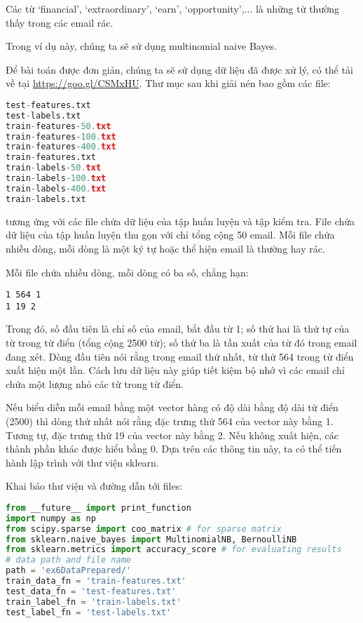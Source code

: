 Các từ `financial',
`extraordinary', `earn', `opportunity',... là những từ thường thấy trong các email rác.
 
Trong ví dụ này, chúng ta sẽ sử dụng multinomial naive Bayes. 
 
Để bài toán được đơn giản, chúng ta sẽ sử dụng dữ liệu đã được xử lý, có thể tải về tại \url{https://goo.gl/CSMxHU}. Thư mục sau khi giải nén bao gồm các file:
\begin{lstlisting}[language=Python]
test-features.txt 
test-labels.txt 
train-features-50.txt 
train-features-100.txt 
train-features-400.txt 
train-features.txt 
train-labels-50.txt 
train-labels-100.txt 
train-labels-400.txt 
train-labels.txt 
\end{lstlisting}
 
tương ứng với các file chứa dữ liệu của tập huấn luyện và tập kiểm tra. File
 chứa dữ liệu của tập huấn luyện thu gọn với
chỉ tổng cộng 50 email. Mỗi file  chứa nhiều dòng, mỗi
dòng là một ký tự  hoặc  thể hiện email là thường hay rác.
 
Mỗi file  chứa nhiều dòng, mỗi dòng có ba số, chẳng hạn:  
\begin{lstlisting}
1 564 1 
1 19 2 
\end{lstlisting}
Trong đó, số đầu tiên là chỉ số của email, bắt đầu từ 1; số thứ hai là thứ tự
của từ trong từ điển (tổng cộng 2500 từ); số thứ ba là tần xuất của từ đó trong
email đang xét. Dòng đầu tiên nói rằng trong email thứ nhất, từ thứ 564 trong từ
điển xuất hiện một lần. Cách lưu dữ liệu này giúp tiết kiệm bộ nhớ vì
các email chỉ chứa một lượng nhỏ các từ trong từ điển.
 
Nếu biểu diễn mỗi email bằng một vector hàng có độ dài bằng độ dài từ điển
(2500) thì dòng thứ nhất nói rằng đặc trưng thứ 564 của vector này bằng 1. Tương
tự, đặc trưng thứ 19 của vector này bằng 2. Nếu không xuất hiện, các thành phần
khác được hiểu bằng 0. Dựa trên các thông tin này, ta có thể tiến hành
lập trình với thư viện sklearn.
 
{Khai báo thư viện và đường dẫn tới files:}  
 
\begin{lstlisting}[language=Python]
from __future__ import print_function
import numpy as np 
from scipy.sparse import coo_matrix # for sparse matrix 
from sklearn.naive_bayes import MultinomialNB, BernoulliNB 
from sklearn.metrics import accuracy_score # for evaluating results 
# data path and file name  
path = 'ex6DataPrepared/' 
train_data_fn = 'train-features.txt' 
test_data_fn = 'test-features.txt' 
train_label_fn = 'train-labels.txt' 
test_label_fn = 'test-labels.txt' 
\end{lstlisting}
 
